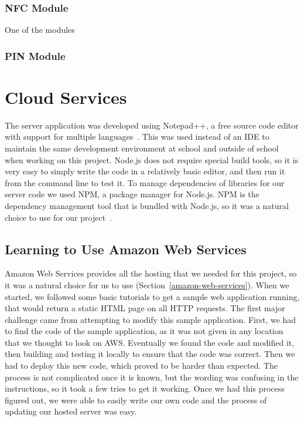 \documentclass[12pt]{report}
\let\Oldsection\section
\renewcommand{\section}{\FloatBarrier\Oldsection}
\let\Oldsubsection\subsection
\renewcommand{\subsection}{\FloatBarrier\Oldsubsection}
\let\Oldsubsubsection\subsubsection
\renewcommand{\subsubsection}{\FloatBarrier\Oldsubsubsection}
\begin{document}
\subsubsection{NFC Module} \label{nfc-modules}

One of the modules 

\subsubsection{PIN Module} \label{pin-modules}




\section{Cloud Services} \label{cloud-services}

The server application was developed using Notepad++, a free source code editor with support
for multiple languages~\autocite{NOTEPADPLUSPLUS}. This was used instead of an IDE to maintain the same development
environment at school and outside of school when working on this project. Node.js does not
require special build tools, so it is very easy to simply write the code in a relatively basic
editor, and then run it from the command line to test it. To manage dependencies of libraries
for our server code we used NPM, a package manager for Node.js. NPM is the dependency management
tool that is bundled with Node.js, so it was a natural choice to use for our project~\autocite{NODENPM}.



\subsection{Learning to Use Amazon Web Services} \label{learning-to-use-amazon-web-services}

Amazon Web Services provides all the hosting that we needed for this project, so it was a
natural choice for us to use (Section~\ref{amazon-web-services}). When we started, we followed
some basic tutorials to get a sample
web application running, that would return a static HTML page on all HTTP requests. The first
major challenge came from attempting to modify this sample application. First, we had to find
the code of the sample application, as it was not given in any location that we thought to look on
AWS. Eventually we found the code and modified it, then building and testing it locally to
ensure that the code was correct. Then we had to deploy this new code, which proved to be
harder than expected. The process is not complicated once it is known, but the wording was
confusing in the instructions, so it took a few tries to get it working. Once we had this process
figured out, we were able to easily write our own code and the process of updating our hosted
server was easy.
\end{document}
